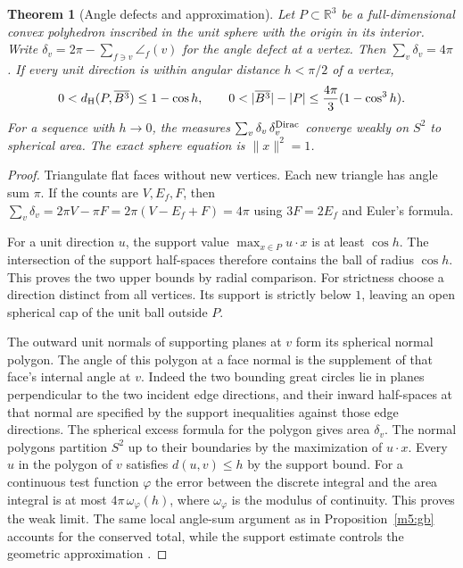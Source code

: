 \documentclass[11pt,reqno]{amsart}
\newtheorem{theorem}{Theorem}[section]
\theoremstyle{definition}
\theoremstyle{remark}
\numberwithin{equation}{section}
\begin{document}
\begin{theorem}[Angle defects and approximation]\label{m8:poly}
Let $P\subset\mathbb R^3$ be a full-dimensional convex polyhedron
inscribed in the unit sphere with the origin in its interior.
Write $\delta_v=2\pi-\sum_{f\ni v}\angle_f(v)$ for the angle
defect at a vertex. Then $\sum_v\delta_v=4\pi$. If every unit
direction is within angular distance $h<\pi/2$ of a vertex,
\[
 0<d_{\rm H}(P,\overline{B^3})\le1-\cos h,\qquad
 0<|\overline{B^3}|-|P|\le\frac{4\pi}{3}(1-\cos^3h).
\]
For a sequence with $h\to0$, the measures
$\sum_v\delta_v\,\delta^{\rm Dirac}_v$ converge weakly on $S^2$
to spherical area. The exact sphere equation is $\|x\|^2=1$.
\end{theorem}
\begin{proof}
Triangulate flat faces without new vertices. Each new triangle has
angle sum $\pi$. If the counts are $V,E_f,F$, then
$\sum_v\delta_v=2\pi V-\pi F=2\pi(V-E_f+F)=4\pi$ using
$3F=2E_f$ and Euler's formula.

For a unit direction $u$, the support value
$\max_{x\in P}u\cdot x$ is at least $\cos h$. The intersection
of the support half-spaces therefore contains the ball of
radius $\cos h$. This proves the two upper bounds by radial
comparison. For strictness choose a direction distinct from
all vertices. Its support is strictly below $1$, leaving an
open spherical cap of the unit ball outside $P$.

The outward unit normals of supporting planes at $v$ form its
spherical normal polygon. The angle of this polygon at a face
normal is the supplement of that face's internal angle at $v$.
Indeed the two bounding great circles lie in planes perpendicular
to the two incident edge directions, and their inward half-spaces
at that normal are specified by the support inequalities against
those edge directions. The spherical excess formula for the
polygon gives area $\delta_v$. The normal polygons partition
$S^2$ up to their boundaries by the maximization of $u\cdot x$.
Every $u$ in the polygon of $v$ satisfies
$d(u,v)\le h$ by the support bound. For a continuous test function
$\varphi$ the error between the discrete integral and the area
integral is at most $4\pi\,\omega_\varphi(h)$, where
$\omega_\varphi$ is the modulus of continuity. This proves the
weak limit. The same local angle-sum argument as in
Proposition~\ref{m5:gb} accounts for the conserved total, while
the support estimate controls the geometric approximation
\cite{m8:cheeger}.
\end{proof}
\end{document}
